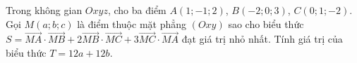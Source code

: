 \begin{ex}
Trong không gian $Oxyz$, cho ba điểm $A(1;-1;2)$, $B(-2;0;3)$, $C(0;1;-2)$. Gọi $M(a;b;c)$ là điểm thuộc mặt phẳng $(Oxy)$ sao cho biểu thức $S=\overrightarrow{MA}\cdot\overrightarrow{MB}+2\overrightarrow{MB}\cdot\overrightarrow{MC}+3\overrightarrow{MC}\cdot\overrightarrow{MA}$ đạt giá trị nhỏ nhất. Tính giá trị của biểu thức $T=12a+12b$.
\end{ex}
